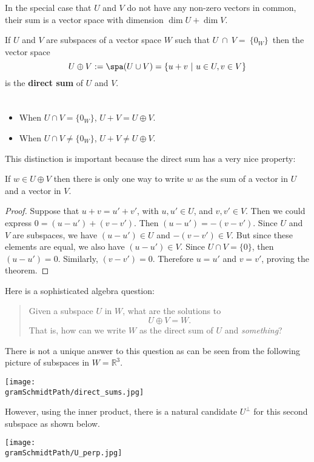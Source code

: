 In the special case that $U$ and $V$ do not have any non-zero vectors in common, their sum is a vector space with dimension $\dim U + \dim V$. 


\begin{definition}
If  $U$ and $V$ are subspaces of a vector space $W$ such that 
$U~\cap~V=~\{0_W\}\, $
then the vector space
\[
U \oplus V := \spa (U\cup V)= \{u+v ~|~ u\in U, v\in V \}
\]
is the {\bf direct sum} of $U$ and $V$.
\end{definition}

\begin{remark}

$\phantom{JUNK HERE}$\\[-8mm]

\begin{itemize}
\item When $U\cap V= \{0_W\}$, $U+V=U\oplus V.$ 
\item When $U\cap V \neq \{0_W\}$, $U+V \neq U\oplus V$.
\end{itemize}
\end{remark}

\noindent This distinction is important because the direct sum has a very nice property:

\begin{theorem}
If $w\in U\oplus V$  then 
there is only one way to write \(w\) as the sum of a vector in \(U\) and a vector in \(V\).  
\end{theorem}

\begin{proof}
Suppose that $u+v=u'+v'$, with $u,u'\in U$, and $v,v' \in V$.  Then we could express $0=(u-u')+(v-v')$.  Then $(u-u')=-(v-v')$.  Since $U$ and $V$ are subspaces, we have $(u-u')\in U$ and $-(v-v')\in V$.  But since these elements are equal, we also have $(u-u')\in V$.  Since $U\cap V=\{0\}$, then $(u-u')=0$.  Similarly, $(v-v')=0$. Therefore $u=u'$ and  $v=v'$, proving the theorem. 
\end{proof}



\noindent Here is a sophisticated algebra question:
\begin{quote}
Given a subspace $U$ in $W$, what are the solutions to 
\[ U\oplus V =W.\]
That is, how can we write $W$ as the direct sum of $U$ and \emph{something}? 
\end{quote}
There is not a unique answer to this question as can be seen from the following picture of subspaces in $W={\mathbb R}^3$. 
\begin{center}
\texttt{[image: \\gramSchmidtPath/direct\_sums.jpg]}
\end{center}
However, using the inner product, there is a natural candidate $U^\perp$ for this second subspace as shown below.
\begin{center}
\texttt{[image: \\gramSchmidtPath/U\_perp.jpg]}
\end{center}


